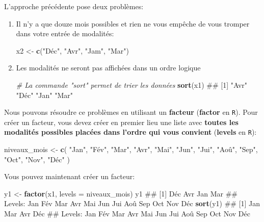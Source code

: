 \documentclass[]{book}
\newenvironment{Shaded}{\begin{snugshade}}{\end{snugshade}}
\newcommand{\CommentTok}[1]{\textcolor[rgb]{0.56,0.35,0.01}{\textit{#1}}}
\newcommand{\DataTypeTok}[1]{\textcolor[rgb]{0.13,0.29,0.53}{#1}}
\newcommand{\KeywordTok}[1]{\textcolor[rgb]{0.13,0.29,0.53}{\textbf{#1}}}
\newcommand{\NormalTok}[1]{#1}
\newcommand{\StringTok}[1]{\textcolor[rgb]{0.31,0.60,0.02}{#1}}
\theoremstyle{definition}
\theoremstyle{definition}
\theoremstyle{definition}
\theoremstyle{remark}
\begin{document}
L'approche précédente pose deux problèmes:

\begin{enumerate}
\def\labelenumi{\arabic{enumi}.}
\item
  Il n'y a que douze mois possibles et rien ne vous empêche de vous
  tromper dans votre entrée de modalités:

\begin{Shaded}
\begin{Highlighting}[]
\NormalTok{x2 <-}\StringTok{ }\KeywordTok{c}\NormalTok{(}\StringTok{"Déc"}\NormalTok{, }\StringTok{"Avr"}\NormalTok{, }\StringTok{"Jam"}\NormalTok{, }\StringTok{"Mar"}\NormalTok{)}
\end{Highlighting}
\end{Shaded}
\item
  Les modalités ne seront pas affichées dans un ordre logique

\begin{Shaded}
\begin{Highlighting}[]
\CommentTok{# La commande "sort" permet de trier les données}
\KeywordTok{sort}\NormalTok{(x1)}
\NormalTok{## [1] "Avr" "Déc" "Jan" "Mar"}
\end{Highlighting}
\end{Shaded}
\end{enumerate}

Nous pouvons résoudre ce problèmes en utilisant un \textbf{facteur}
(\textbf{factor} en \texttt{R}). Pour créer un facteur, vous devez créer
en premier lieu une liste avec \textbf{toutes les modalités possibles
placées dans l'ordre qui vous convient} (\textbf{levels} en \texttt{R}):

\begin{Shaded}
\begin{Highlighting}[]
\NormalTok{niveaux_mois <-}\StringTok{ }\KeywordTok{c}\NormalTok{(}
  \StringTok{"Jan"}\NormalTok{, }\StringTok{"Fév"}\NormalTok{, }\StringTok{"Mar"}\NormalTok{, }\StringTok{"Avr"}\NormalTok{, }\StringTok{"Mai"}\NormalTok{, }\StringTok{"Jun"}\NormalTok{,}
  \StringTok{"Jui"}\NormalTok{, }\StringTok{"Aoû"}\NormalTok{, }\StringTok{"Sep"}\NormalTok{, }\StringTok{"Oct"}\NormalTok{, }\StringTok{"Nov"}\NormalTok{, }\StringTok{"Déc"}
\NormalTok{)}
\end{Highlighting}
\end{Shaded}

Vous pouvez maintenant créer un facteur:

\begin{Shaded}
\begin{Highlighting}[]
\NormalTok{y1 <-}\StringTok{ }\KeywordTok{factor}\NormalTok{(x1, }\DataTypeTok{levels =}\NormalTok{ niveaux_mois)}
\NormalTok{y1}
\NormalTok{## [1] Déc Avr Jan Mar}
\NormalTok{## Levels: Jan Fév Mar Avr Mai Jun Jui Aoû Sep Oct Nov Déc}
\KeywordTok{sort}\NormalTok{(y1)}
\NormalTok{## [1] Jan Mar Avr Déc}
\NormalTok{## Levels: Jan Fév Mar Avr Mai Jun Jui Aoû Sep Oct Nov Déc}
\end{Highlighting}
\end{Shaded}
\end{document}
